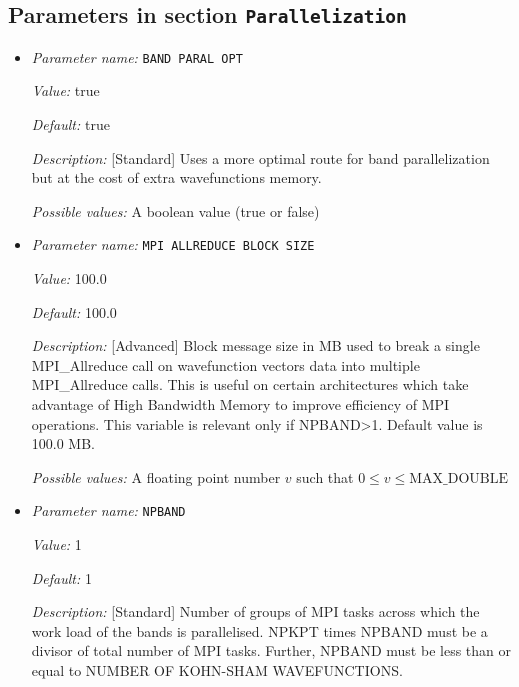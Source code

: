 \subsection{Parameters in section \tt Parallelization}
\label{parameters:Parallelization}

\begin{itemize}
\item {\it Parameter name:} {\tt BAND PARAL OPT}
\label{parameters:Parallelization/BAND PARAL OPT}
\label{parameters:Parallelization/BAND_20PARAL_20OPT}


{\it Value:} true


{\it Default:} true


{\it Description:} [Standard] Uses a more optimal route for band parallelization but at the cost of extra wavefunctions memory.


{\it Possible values:} A boolean value (true or false)
\item {\it Parameter name:} {\tt MPI ALLREDUCE BLOCK SIZE}
\label{parameters:Parallelization/MPI ALLREDUCE BLOCK SIZE}
\label{parameters:Parallelization/MPI_20ALLREDUCE_20BLOCK_20SIZE}


{\it Value:} 100.0


{\it Default:} 100.0


{\it Description:} [Advanced] Block message size in MB used to break a single MPI\_Allreduce call on wavefunction vectors data into multiple MPI\_Allreduce calls. This is useful on certain architectures which take advantage of High Bandwidth Memory to improve efficiency of MPI operations. This variable is relevant only if NPBAND>1. Default value is 100.0 MB.


{\it Possible values:} A floating point number $v$ such that $0 \leq v \leq \text{MAX\_DOUBLE}$
\item {\it Parameter name:} {\tt NPBAND}
\label{parameters:Parallelization/NPBAND}


{\it Value:} 1


{\it Default:} 1


{\it Description:} [Standard] Number of groups of MPI tasks across which the work load of the bands is parallelised. NPKPT times NPBAND must be a divisor of total number of MPI tasks. Further, NPBAND must be less than or equal to NUMBER OF KOHN-SHAM WAVEFUNCTIONS.



\end{itemize}
